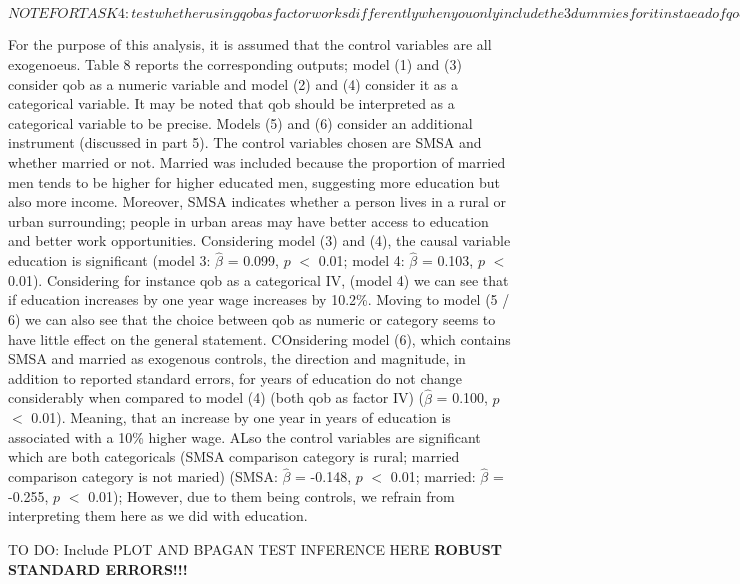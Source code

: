 \documentclass[a4paper]{article}
\begin{document}
\textbf{$NOTE FOR TASK 4: test whether using qob as factor works differently when you only include the 3 dummies for it instaead of qob_fac$}



For the purpose of this analysis, it is assumed that the control variables are all exogenoeus. Table 8 reports the corresponding outputs; model (1) and (3) consider qob as a numeric variable and model (2) and (4) consider it as a categorical variable. It may be noted that qob should be interpreted as a categorical variable to be precise.
Models (5) and (6) consider an additional instrument (discussed in part 5).
The control variables chosen are SMSA and whether married or not. Married was included because the proportion of married men tends to be higher for higher educated men, suggesting more education but also more income. Moreover, SMSA indicates whether a person lives in a rural or urban surrounding; people in urban areas may have better access to education and better work opportunities.
Considering model (3) and (4), the causal variable education is significant (model 3: $\hat{\beta}$ = 0.099, $p$ $<$ 0.01; model 4: $\hat{\beta}$ = 0.103, $p$ $<$ 0.01). Considering for instance qob as a categorical IV, (model 4) we can see that if education increases by one year wage increases by 10.2\%. Moving to model (5 / 6) we can also see that the choice between qob as numeric or category seems to have little effect on the general statement.
COnsidering model (6), which contains SMSA and married as exogenous controls, the direction and magnitude, in addition to reported standard errors, for years of education do not change considerably when compared to model (4) (both qob as factor IV) ($\hat{\beta}$ = 0.100, $p$ $<$ 0.01). Meaning, that an increase by one year in years of education is associated with a 10\% higher wage. ALso the control variables are significant which are both categoricals (SMSA comparison category is rural; married comparison category is not maried) (SMSA: $\hat{\beta}$ = -0.148, $p$ $<$ 0.01; married: $\hat{\beta}$ = -0.255, $p$ $<$ 0.01); However, due to them being controls, we refrain from interpreting them here as we did with education. 

TO DO: Include PLOT AND BPAGAN TEST INFERENCE HERE
 \textbf{ROBUST STANDARD ERRORS!!!}
 
\end{document}
